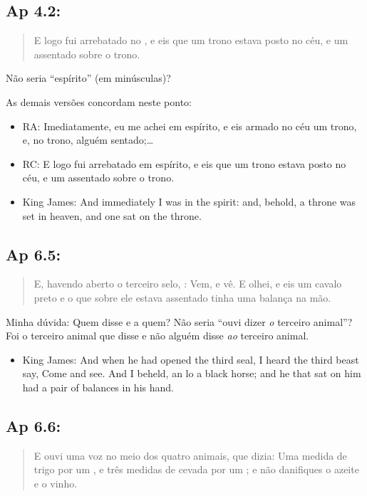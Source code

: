 \subsection*{Ap 4.2:}
\begin{quote}
    \small
E logo fui arrebatado no , e eis que um trono estava posto no céu, e um assentado sobre o trono.
\end{quote}

Não seria ``espírito'' (em minúsculas)?

As demais versões concordam neste ponto:
\begin{itemize}
\item RA: Imediatamente, eu me achei em espírito, e eis armado no céu um
trono, e, no trono, alguém sentado;\ldots
\item RC: E logo fui arrebatado em espírito, e eis que um trono estava
posto no céu, e um assentado sobre o trono.
\item King James: And immediately I was in the spirit: and, behold, a throne was set in heaven, and one sat on the throne.
\end{itemize}

\subsection*{Ap 6.5:}
\begin{quote}
    \small
E, havendo aberto o terceiro selo, : Vem, e vê. E olhei, e eis um cavalo preto e o que sobre ele estava assentado tinha uma balança na mão.
\end{quote}

Minha dúvida: Quem disse e a quem? Não seria ``ouvi dizer \emph{o} terceiro animal''? Foi o terceiro animal que disse e não alguém disse \emph{ao} terceiro animal.

\begin{itemize}
\item King James: And when he had opened the third seal, I heard the third beast say, Come and see. And I beheld, an lo a black horse; and he that sat on him had a pair of balances in his hand.
\end{itemize}

\subsection*{Ap 6.6:}
\begin{quote}
    \small
E ouvi uma voz no meio dos quatro animais, que dizia: Uma
medida de trigo por um , e três medidas de cevada por um ; e não danifiques o azeite e o vinho.
\end{quote}

